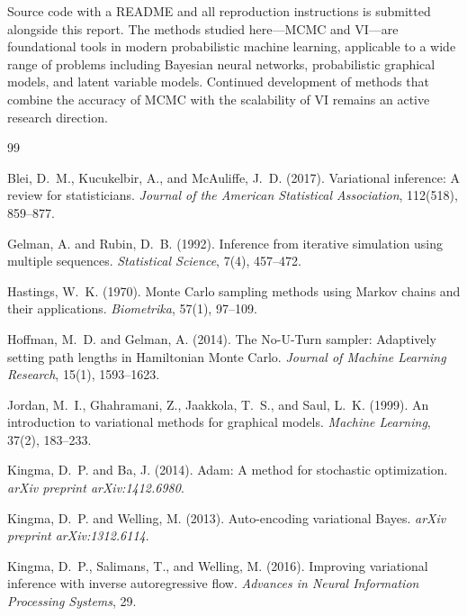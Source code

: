 \documentclass[12pt,a4paper]{article}
\begin{document}
Source code with a README and all reproduction instructions is
submitted alongside this report.
The methods studied here---MCMC and VI---are foundational tools in
modern probabilistic machine learning, applicable to a wide range of
problems including Bayesian neural networks, probabilistic graphical
models, and latent variable models.
Continued development of methods that combine the accuracy of MCMC
with the scalability of VI remains an active research direction.




\begin{thebibliography}{99}

Blei, D.~M., Kucukelbir, A., and McAuliffe, J.~D. (2017).
Variational inference: A review for statisticians.
\textit{Journal of the American Statistical Association}, 112(518), 859--877.

Gelman, A. and Rubin, D.~B. (1992).
Inference from iterative simulation using multiple sequences.
\textit{Statistical Science}, 7(4), 457--472.

Hastings, W.~K. (1970).
Monte Carlo sampling methods using Markov chains and their applications.
\textit{Biometrika}, 57(1), 97--109.

Hoffman, M.~D. and Gelman, A. (2014).
The No-U-Turn sampler: Adaptively setting path lengths in Hamiltonian Monte Carlo.
\textit{Journal of Machine Learning Research}, 15(1), 1593--1623.

Jordan, M.~I., Ghahramani, Z., Jaakkola, T.~S., and Saul, L.~K. (1999).
An introduction to variational methods for graphical models.
\textit{Machine Learning}, 37(2), 183--233.

Kingma, D.~P. and Ba, J. (2014).
Adam: A method for stochastic optimization.
\textit{arXiv preprint arXiv:1412.6980}.

Kingma, D.~P. and Welling, M. (2013).
Auto-encoding variational Bayes.
\textit{arXiv preprint arXiv:1312.6114}.

Kingma, D.~P., Salimans, T., and Welling, M. (2016).
Improving variational inference with inverse autoregressive flow.
\textit{Advances in Neural Information Processing Systems}, 29.


\end{thebibliography}
\end{document}
